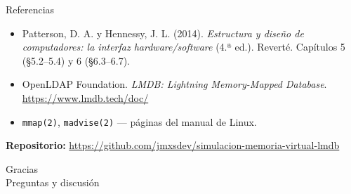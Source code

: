 \documentclass[aspectratio=169,11pt]{beamer}
\begin{document}
\begin{frame}{Referencias}
  \begin{itemize}
    \item Patterson, D. A. y Hennessy, J. L. (2014). \emph{Estructura y diseño
      de computadores: la interfaz hardware/software} (4.ª ed.). Reverté.
      Capítulos 5 (\S5.2--5.4) y 6 (\S6.3--6.7).
    \item OpenLDAP Foundation. \emph{LMDB: Lightning Memory-Mapped Database}.
      \url{https://www.lmdb.tech/doc/}
    \item \texttt{mmap(2)}, \texttt{madvise(2)} --- páginas del manual de Linux.
  \end{itemize}

  \vspace{0.5cm}
  \begin{center}
    \textbf{Repositorio:} \url{https://github.com/jmxsdev/simulacion-memoria-virtual-lmdb}
  \end{center}
\end{frame}

\begin{frame}
  \centering
  \Huge Gracias
  \vspace{0.5cm}
  \normalsize
  \\ Preguntas y discusión
\end{frame}
\end{document}
